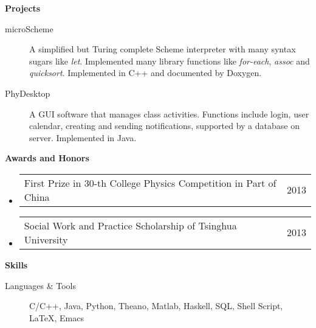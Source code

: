 \documentclass[letterpaper,11pt]{article}
\makeatletter
\newcommand{\resheading}[1]{{\large \colorbox{mygrey}{\begin{minipage}{\textwidth}{\textbf{#1 \vphantom{p\^{E}}}}\end{minipage}}}}
\newcommand{\ressubsubheadingni}[2]{
  \begin{tabular*}{6.5in}{l@{\extracolsep{\fill}}r}
	#1 & #2 \\
  \end{tabular*}\vspace{-7pt}}
\makeatother
\begin{document}
\resheading{Projects}
\begin{description}
\item[microScheme] {A simplified but Turing complete Scheme interpreter with many syntax sugars like \emph{let}. Implemented many library functions like \emph{for-each}, \emph{assoc} and \emph{quicksort}. Implemented in C++ and documented by Doxygen.}
\item[PhyDesktop] {A GUI software that manages class activities. Functions include login, user calendar, creating and sending notifications, supported by a database on server. Implemented in Java.}
\end{description}

\resheading{Awards and Honors}
\begin{itemize}
\item\ressubsubheadingni{First Prize in 30-th College Physics Competition in Part of China}{2013}
\item\ressubsubheadingni{Social Work and Practice Scholarship of Tsinghua University}{2013}
\end{itemize}

\resheading{Skills}
\begin{description}
\item[Languages \& Tools] {C/C++, Java, Python, Theano, Matlab, Haskell, SQL, Shell Script, \LaTeX, Emacs}
\end{description} %


\begin{comment}
  \resheading{Standardized Tests}
  \begin{description}
  \item[TOEFL] {R: 30, L: 29, S: 23, W: 25, Total:107}
  \item[GRE] {V: 156, Q: 170, AW: 3.5}
  \end{description}
\end{comment}
\end{document}
